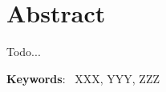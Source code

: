 \chapter{Abstract}

Todo...

\vspace{1em}
\setlength{\parindent}{0em}
\textbf{Keywords}:~ XXX, YYY, ZZZ
